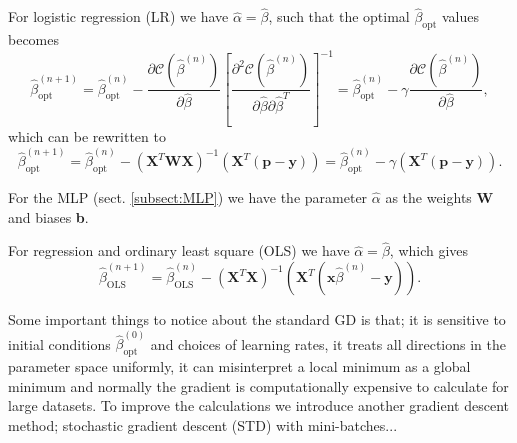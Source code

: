 \documentclass[12pt,a4paper,english]{article}
\begin{document}
For logistic regression (LR) we have $\hat{\alpha}=\hat{\beta}$, such that the optimal $\hat{\beta}_{\text{opt}}$ values becomes
\begin{equation}
\label{eq:GD}
\hat{\beta}_{\text{opt}}^{(n+1)}=\hat{\beta}_{\text{opt}}^{(n)}-\frac{\partial \mathcal{C}(\hat{\beta}^{(n)})}{\partial \hat{\beta}}\left[\frac{\partial^2 \mathcal{C}(\hat{\beta}^{(n)})}{\partial \hat{\beta}\partial \hat{\beta}^T}\right]^{-1}=\hat{\beta}^{(n)}_{\text{opt}}-\gamma\frac{\partial \mathcal{C}(\hat{\beta}^{(n)})}{\partial \hat{\beta}},
\end{equation}
which can be rewritten to
\begin{equation}
\label{eq:GD_opt}
\hat{\beta}_{\text{opt}}^{(n+1)}=\hat{\beta}_{\text{opt}}^{(n)}-(\textbf{X}^T\textbf{W}\textbf{X})^{-1}(\textbf{X}^T(\textbf{p}-\textbf{y}))=\hat{\beta}_{\text{opt}}^{(n)}-\gamma(\textbf{X}^T(\textbf{p}-\textbf{y})).
\end{equation}

For the MLP (sect. \ref{subsect:MLP}) we have the parameter $\hat{\alpha}$ as the weights \textbf{W} and biases \textbf{b}.

For regression and ordinary least square (OLS) we have $\hat{\alpha}=\hat{\beta}$, which gives
\begin{equation}
\label{eq:GD_OLS}
\hat{\beta}_{\text{OLS}}^{(n+1)}=\hat{\beta}_{\text{OLS}}^{(n)}-(\textbf{X}^T\textbf{X})^{-1}(\textbf{X}^T(\textbf{x}\hat{\beta}^{(n)}-\textbf{y})).
\end{equation}

Some important things to notice about the standard GD is that; it is sensitive to initial conditions $\hat{\beta}^{(0)}_{\text{opt}}$ and choices of learning rates, it treats all directions in the parameter space uniformly, it can misinterpret a local minimum as a global minimum and normally the gradient is computationally expensive to calculate for large datasets. To improve the calculations we introduce another gradient descent method; stochastic gradient descent (STD) with mini-batches...
\end{document}
